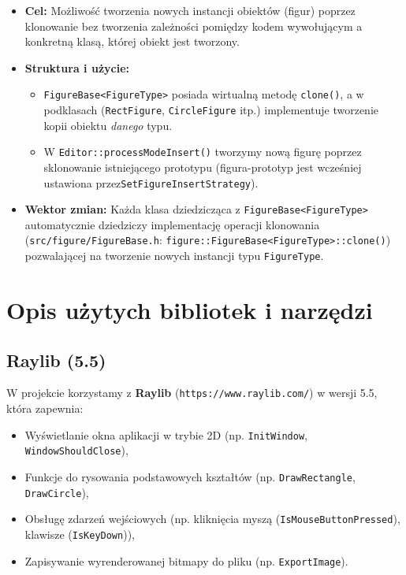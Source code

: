 \documentclass[a4paper,12pt]{article}
\begin{document}
\begin{itemize}
    \item \textbf{Cel:} Możliwość tworzenia nowych instancji obiektów (figur)
      poprzez klonowanie bez tworzenia zależności pomiędzy kodem wywołującym 
      a konkretną klasą, której obiekt jest tworzony.
    \item \textbf{Struktura i użycie:}
    \begin{itemize}
      \item \texttt{FigureBase<FigureType>} posiada wirtualną metodę \texttt{clone()},
      a w podklasach (\texttt{RectFigure}, \texttt{CircleFigure} itp.) implementuje 
      tworzenie kopii obiektu \emph{danego} typu.
      \item W \texttt{Editor::processModeInsert()} tworzymy nową figurę poprzez
      sklonowanie istniejącego prototypu (figura-prototyp jest wcześniej
      ustawiona przez\break \texttt{SetFigureInsertStrategy}).
    \end{itemize}
    \item \textbf{Wektor zmian:} Każda klasa dziedzicząca z \texttt{FigureBase<FigureType>}
      automatycznie dziedziczy implementację operacji klonowania (\verb|src/figure/FigureBase.h|: \verb|figure::FigureBase<FigureType>::clone()|) pozwalającej na tworzenie
    nowych instancji typu \texttt{FigureType}.
\end{itemize}

\section{Opis użytych bibliotek i narzędzi}

\subsection{Raylib (5.5)}
W projekcie korzystamy z \textbf{Raylib} (\verb|https://www.raylib.com/|) w wersji 5.5, która zapewnia:
\begin{itemize}
    \item Wyświetlanie okna aplikacji w trybie 2D (np. \texttt{InitWindow}, \texttt{WindowShouldClose}),
    \item Funkcje do rysowania podstawowych kształtów (np. \texttt{DrawRectangle}, \texttt{DrawCircle}),
    \item Obsługę zdarzeń wejściowych (np. kliknięcia myszą (\texttt{IsMouseButtonPressed}), klawisze (\texttt{IsKeyDown})),
    \item Zapisywanie wyrenderowanej bitmapy do pliku (np. \texttt{ExportImage}).
\end{itemize}
\end{document}
